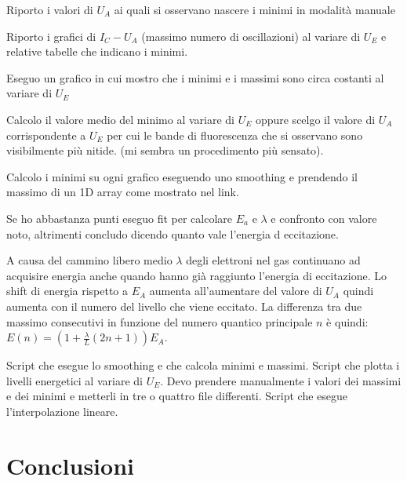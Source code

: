 \documentclass[10pt,a4paper]{article}
\begin{document}

Riporto i valori di $U_A$ ai quali si osservano nascere i minimi in modalità manuale

Riporto i grafici di $I_C-U_A$ (massimo numero di oscillazioni) al variare di $U_E$ e relative tabelle che indicano i minimi.

Eseguo un grafico in cui mostro che i minimi e i massimi sono circa costanti al variare di $U_E$

Calcolo il valore medio del minimo al variare di $U_E$ oppure scelgo il valore di $U_A$ corrispondente a $U_E$ per cui le bande di fluorescenza che si osservano sono visibilmente più nitide. (mi sembra un procedimento più sensato).

Calcolo i minimi su ogni grafico eseguendo uno smoothing e prendendo il massimo di un 1D array come mostrato nel link.

Se ho abbastanza punti eseguo fit per calcolare $E_a$ e $\lambda$ e confronto con valore noto, altrimenti concludo dicendo quanto vale l'energia d eccitazione. 

A causa del cammino libero medio $\lambda$ degli elettroni nel gas continuano ad acquisire energia anche quando hanno già raggiunto l'energia di eccitazione. Lo shift di energia rispetto a $E_A$ aumenta all'aumentare del valore di $U_A$ quindi aumenta con il numero del livello che viene eccitato. La differenza tra due massimo consecutivi in funzione del numero quantico principale $n$ è quindi: $E(n) = ( 1 + \frac{\lambda}{L} ( 2 n + 1 ) ) E_A$. 

Script che esegue lo smoothing e che calcola minimi e massimi.
Script che plotta i livelli energetici al variare di $U_E$.
Devo prendere manualmente i valori dei massimi e dei minimi e metterli in tre o quattro file differenti.
Script che esegue l'interpolazione lineare.
 

\section{Conclusioni}
\end{document}
